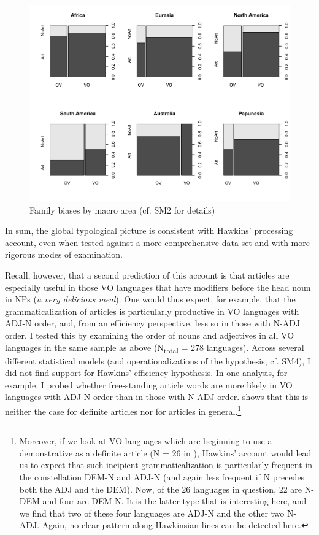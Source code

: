 \documentclass[output=paper]{langsci/langscibook}
\begin{document}
 
\begin{figure}
\includegraphics[width=\textwidth]{figures/ksb3.pdf}
\caption{Family biases by macro area (cf. SM2 for details)}
\label{fig:ksb:3}
\end{figure}

In sum, the global typological picture is consistent with Hawkins’ processing account, even when tested against a more comprehensive data set and with more rigorous modes of examination. 

Recall, however, that a second prediction of this account is that articles are especially useful in those VO languages that have modifiers before the head noun in NPs (\textit{a very delicious meal}). One would thus expect, for example, that the grammaticalization of articles is particularly productive in VO languages with ADJ-N order, and, from an efficiency perspective, less so in those with N-ADJ order. I tested this by examining the order of nouns and adjectives \citep{Dryer2013_Adj} in all VO languages in the same sample as above (N\textsubscript{total} = 278 languages). Across several different statistical models (and operationalizations of the hypothesis, cf. SM4), I did not find support for Hawkins’ efficiency hypothesis. In one analysis, for example, I probed whether free-standing article words are more likely in VO languages with ADJ-N order than in those with N-ADJ order.  shows that this is neither the case for definite articles nor for articles in general.\footnote{Moreover, if we look at VO languages which are beginning to use a demonstrative as a definite article (N = 26 in \citealt{Dryer2013_Def}), Hawkins’ account would lead us to expect that such incipient grammaticalization is particularly frequent in the constellation DEM-N and ADJ-N (and again less frequent if N precedes both the ADJ and the DEM). Now, of the 26 languages in question, 22 are N-DEM and four are DEM-N. It is the latter type that is interesting here, and we find that two of these four languages are ADJ-N and the other two N-ADJ. Again, no clear pattern along Hawkinsian lines can be detected here.} 
\end{document}
